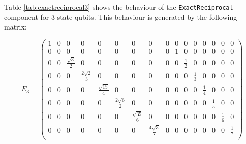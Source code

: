 \documentclass[12pt]{extarticle}
\begin{document}
Table \ref{tab:exactreciprocal3} shows the behaviour of the \texttt{ExactReciprocal} component for 3 state qubits.
This behaviour is generated by the following matrix:

\setcounter{MaxMatrixCols}{20}
\begin{small}
\[
E_3 = \begin{pmatrix}
1 &  0 & 0                   & 0                   & 0                   & 0                   & 0                   & 0                   & 0 & 0  & 0                  & 0                   & 0                   & 0                   & 0                   & 0 \\
0 &  0 & 0                   & 0                   & 0                   & 0                   & 0                   & 0                   & 0 & 1  & 0                  & 0                   & 0                   & 0                   & 0                   & 0 \\
0 &  0 & \frac{\sqrt{3}}{2}  & 0                   & 0                   & 0                   & 0                   & 0                   & 0 & 0  & \frac{1}{2}        & 0                   & 0                   & 0                   & 0                   & 0 \\
0 &  0 & 0                   & \frac{2\sqrt{2}}{3} & 0                   & 0                   & 0                   & 0                   & 0 & 0  & 0                  & \frac{1}{3}         & 0                   & 0                   & 0                   & 0 \\
0 &  0 & 0                   & 0                   & \frac{\sqrt{15}}{4} & 0                   & 0                   & 0                   & 0 & 0  & 0                  & 0                   & \frac{1}{4}         & 0                   & 0                   & 0 \\
0 &  0 & 0                   & 0                   & 0                   & \frac{2\sqrt{6}}{2} & 0                   & 0                   & 0 & 0  & 0                  & 0                   & 0                   & \frac{1}{5}         & 0                   & 0 \\
0 &  0 & 0                   & 0                   & 0                   & 0                   & \frac{\sqrt{35}}{6} & 0                   & 0 & 0  & 0                  & 0                   & 0                   & 0                   & \frac{1}{6}         & 0 \\
0 &  0 & 0                   & 0                   & 0                   & 0                   & 0                   & \frac{4\sqrt{3}}{7} & 0 & 0  & 0                  & 0                   & 0                   & 0                   & 0                   & \frac{1}{7} \\

\end{pmatrix}\]
\end{small}
\end{document}
